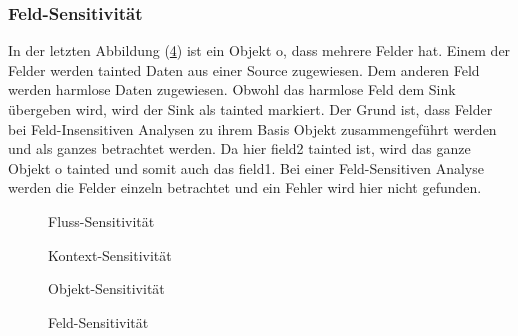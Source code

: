 \documentclass[runningheads]{llncs}
\begin{document}
\subsubsection{Feld-Sensitivität}
In der letzten Abbildung (\ref{fig:field_code}) ist ein Objekt o, dass mehrere Felder hat. Einem der Felder werden tainted Daten aus einer Source zugewiesen. Dem anderen Feld werden harmlose Daten zugewiesen. Obwohl das harmlose Feld dem Sink übergeben wird, wird der Sink als tainted markiert. Der Grund ist, dass Felder bei Feld-Insensitiven Analysen zu ihrem Basis Objekt zusammengeführt werden und als ganzes betrachtet werden. Da hier field2 tainted ist, wird das ganze Objekt o tainted und somit auch das field1. Bei einer Feld-Sensitiven Analyse werden die Felder einzeln betrachtet und ein Fehler wird hier nicht gefunden.

\begin{figure}

\caption{Fluss-Sensitivität}
\label{fig:fluss_code}
\end{figure}

\begin{figure}

\caption{Kontext-Sensitivität}
\label{fig:context_code}
\end{figure}

\begin{figure}

\caption{Objekt-Sensitivität}
\label{fig:object_code}
\end{figure}
 
\begin{figure}

\caption{Feld-Sensitivität}
\label{fig:field_code}
\end{figure}

%


\end{document}
